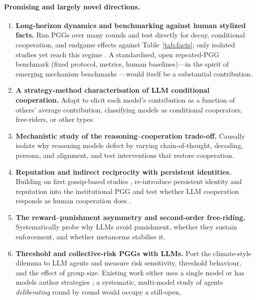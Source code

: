 \documentclass[11pt,a4paper]{article}
\begin{document}
\paragraph{Promising and largely novel directions.}
\begin{enumerate}
  \item \textbf{Long-horizon dynamics and benchmarking against human stylized
  facts.} Run PGGs over many rounds and test directly for decay, conditional
  cooperation, and endgame effects against Table~\ref{tab:facts}; only isolated
  studies yet reach this regime \citep{liu2026memory}. A standardised, open
  repeated-PGG benchmark (fixed protocol, metrics, human baselines)---in the spirit
  of emerging mechanism benchmarks \citep{tewolde2026coopeval}---would itself be a
  substantial contribution.
  \item \textbf{A strategy-method characterisation of LLM conditional
  cooperation.} Adapt \citet{fischbacher2001conditional} to elicit each model's
  contribution as a function of others' average contribution, classifying models
  as conditional cooperators, free-riders, or other types.
  \item \textbf{Mechanistic study of the reasoning--cooperation trade-off.}
  Causally isolate why reasoning models defect \citep{guzman2025corrupted} by
  varying chain-of-thought, decoding, persona, and alignment, and test
  interventions that restore cooperation.
  \item \textbf{Reputation and indirect reciprocity with persistent identities.}
  Building on first gossip-based studies \citep{cross2025validating,zhu2026gossip},
  re-introduce persistent identity and reputation into the institutional PGG and
  test whether LLM cooperation responds as human cooperation does
  \citep{milinski2002reputation,rockenbach2006efficient}.
  \item \textbf{The reward--punishment asymmetry and second-order free-riding.}
  Systematically probe why LLMs avoid punishment, whether they sustain enforcement,
  and whether metanorms \citep{horiguchi2024evolution} stabilise it.
  \item \textbf{Threshold and collective-risk PGGs with LLMs.} Port the
  climate-style dilemma \citep{milinski2008collective,santos2011risk} to LLM
  agents and measure risk sensitivity, threshold behaviour, and the effect of
  group size. Existing work either uses a single model or has models author
  strategies \citep{slumbers2025port,willis2026hundreds}; a systematic, multi-model
  study of agents \emph{deliberating} round by round would occupy a still-open,

\end{enumerate}
\end{document}
